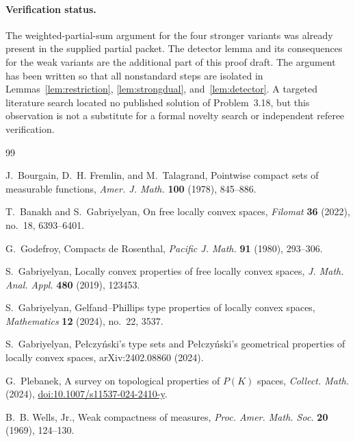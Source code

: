 \documentclass[11pt]{article}
\begin{document}
\paragraph{Verification status.}
The weighted-partial-sum argument for the four stronger variants was already
present in the supplied partial packet.  The detector lemma and its consequences
for the weak variants are the additional part of this proof draft.  The argument
has been written so that all nonstandard steps are isolated in
Lemmas~\ref{lem:restriction}, \ref{lem:strongdual}, and~\ref{lem:detector}.
A targeted literature search located no published solution of Problem~3.18, but
this observation is not a substitute for a formal novelty search or independent
referee verification.

\begin{thebibliography}{99}

J.~Bourgain, D.~H. Fremlin, and M.~Talagrand,
\newblock Pointwise compact sets of measurable functions,
\newblock \emph{Amer. J. Math.} \textbf{100} (1978), 845--886.

T.~Banakh and S.~Gabriyelyan,
\newblock On free locally convex spaces,
\newblock \emph{Filomat} \textbf{36} (2022), no.~18, 6393--6401.

G.~Godefroy,
\newblock Compacts de Rosenthal,
\newblock \emph{Pacific J. Math.} \textbf{91} (1980), 293--306.

S.~Gabriyelyan,
\newblock Locally convex properties of free locally convex spaces,
\newblock \emph{J. Math. Anal. Appl.} \textbf{480} (2019), 123453.

S.~Gabriyelyan,
\newblock Gelfand--Phillips type properties of locally convex spaces,
\newblock \emph{Mathematics} \textbf{12} (2024), no.~22, 3537.

S.~Gabriyelyan,
\newblock Pe{\l}czy\'nski's type sets and Pe{\l}czy\'nski's geometrical properties
of locally convex spaces,
\newblock arXiv:2402.08860 (2024).

G.~Plebanek,
\newblock A survey on topological properties of $P(K)$ spaces,
\newblock \emph{Collect. Math.} (2024),
\newblock \href{https://doi.org/10.1007/s11537-024-2410-y}{doi:10.1007/s11537-024-2410-y}.

B.~B. Wells, Jr.,
\newblock Weak compactness of measures,
\newblock \emph{Proc. Amer. Math. Soc.} \textbf{20} (1969), 124--130.

\end{thebibliography}
\end{document}
